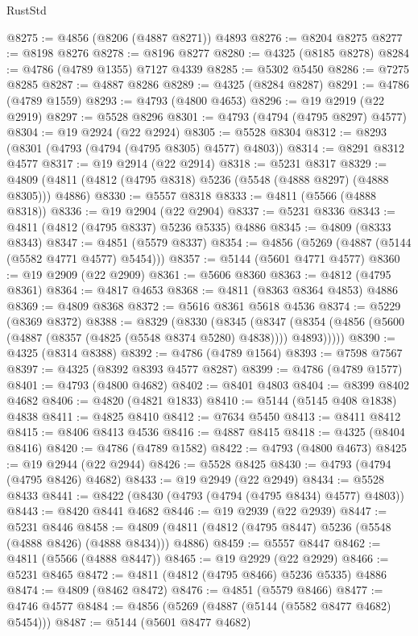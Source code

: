 \begin{lexlean}{RustStd}
\begin{coremodule}
@8275 := @4856 (@8206 (@4887 @8271)) @4893
@8276 := @8204 @8275
@8277 := @8198 @8276
@8278 := @8196 @8277
@8280 := @4325 (@8185 @8278)
@8284 := @4786 (@4789 @1355) @7127 @4339
@8285 := @5302 @5450
@8286 := @7275 @8285
@8287 := @4887 @8286
@8289 := @4325 (@8284 @8287)
@8291 := @4786 (@4789 @1559)
@8293 := @4793 (@4800 @4653)
@8296 := @19 @2919 (@22 @2919)
@8297 := @5528 @8296
@8301 := @4793 (@4794 (@4795 @8297) @4577)
@8304 := @19 @2924 (@22 @2924)
@8305 := @5528 @8304
@8312 := @8293 (@8301 (@4793 (@4794 (@4795 @8305) @4577) @4803))
@8314 := @8291 @8312 @4577
@8317 := @19 @2914 (@22 @2914)
@8318 := @5231 @8317
@8329 := @4809 (@4811 (@4812 (@4795 @8318) @5236 (@5548 (@4888 @8297) (@4888 @8305))) @4886)
@8330 := @5557 @8318
@8333 := @4811 (@5566 (@4888 @8318))
@8336 := @19 @2904 (@22 @2904)
@8337 := @5231 @8336
@8343 := @4811 (@4812 (@4795 @8337) @5236 @5335) @4886
@8345 := @4809 (@8333 @8343)
@8347 := @4851 (@5579 @8337)
@8354 := @4856 (@5269 (@4887 (@5144 (@5582 @4771 @4577) @5454)))
@8357 := @5144 (@5601 @4771 @4577)
@8360 := @19 @2909 (@22 @2909)
@8361 := @5606 @8360
@8363 := @4812 (@4795 @8361)
@8364 := @4817 @4653
@8368 := @4811 (@8363 @8364 @4853) @4886
@8369 := @4809 @8368
@8372 := @5616 @8361 @5618 @4536
@8374 := @5229 (@8369 @8372)
@8388 := @8329
    (@8330
      (@8345
        (@8347 (@8354 (@4856 (@5600 (@4887 (@8357 (@4825 (@5548 @8374 @5280) @4838)))) @4893)))))
@8390 := @4325 (@8314 @8388)
@8392 := @4786 (@4789 @1564)
@8393 := @7598 @7567
@8397 := @4325 (@8392 @8393 @4577 @8287)
@8399 := @4786 (@4789 @1577)
@8401 := @4793 (@4800 @4682)
@8402 := @8401 @4803
@8404 := @8399 @8402 @4682
@8406 := @4820 (@4821 @1833)
@8410 := @5144 (@5145 @408 @1838) @4838
@8411 := @4825 @8410
@8412 := @7634 @5450
@8413 := @8411 @8412
@8415 := @8406 @8413 @4536
@8416 := @4887 @8415
@8418 := @4325 (@8404 @8416)
@8420 := @4786 (@4789 @1582)
@8422 := @4793 (@4800 @4673)
@8425 := @19 @2944 (@22 @2944)
@8426 := @5528 @8425
@8430 := @4793 (@4794 (@4795 @8426) @4682)
@8433 := @19 @2949 (@22 @2949)
@8434 := @5528 @8433
@8441 := @8422 (@8430 (@4793 (@4794 (@4795 @8434) @4577) @4803))
@8443 := @8420 @8441 @4682
@8446 := @19 @2939 (@22 @2939)
@8447 := @5231 @8446
@8458 := @4809 (@4811 (@4812 (@4795 @8447) @5236 (@5548 (@4888 @8426) (@4888 @8434))) @4886)
@8459 := @5557 @8447
@8462 := @4811 (@5566 (@4888 @8447))
@8465 := @19 @2929 (@22 @2929)
@8466 := @5231 @8465
@8472 := @4811 (@4812 (@4795 @8466) @5236 @5335) @4886
@8474 := @4809 (@8462 @8472)
@8476 := @4851 (@5579 @8466)
@8477 := @4746 @4577
@8484 := @4856 (@5269 (@4887 (@5144 (@5582 @8477 @4682) @5454)))
@8487 := @5144 (@5601 @8477 @4682)

\end{coremodule}
\end{lexlean}

